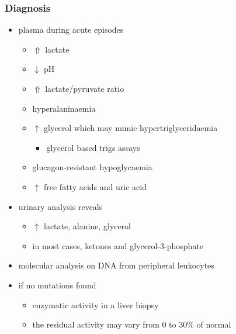 \documentclass{scrartcl}
\begin{document}
\subsubsection{Diagnosis}
\label{sec:orgd8c89bc}
\begin{itemize}
\item plasma during acute episodes
\begin{itemize}
\item \(\Uparrow\) lactate
\item \(\downarrow\) pH
\item \(\Uparrow\) lactate/pyruvate ratio
\item hyperalaninaemia
\item \(\uparrow\) glycerol which may mimic hypertriglyceridaemia
\begin{itemize}
\item glycerol based trigs assays
\end{itemize}
\item glucagon-resistant hypoglycaemia
\item \(\uparrow\) free fatty acids and uric acid
\end{itemize}
\item urinary analysis reveals
\begin{itemize}
\item \(\uparrow\) lactate, alanine, glycerol
\item in most cases, ketones and glycerol-3-phosphate
\end{itemize}

\item molecular analysis on DNA from peripheral leukocytes
\item if no mutations found
\begin{itemize}
\item enzymatic activity in a liver biopsy
\item the residual activity may vary from 0 to 30\% of normal
\end{itemize}
\end{itemize}
\end{document}
